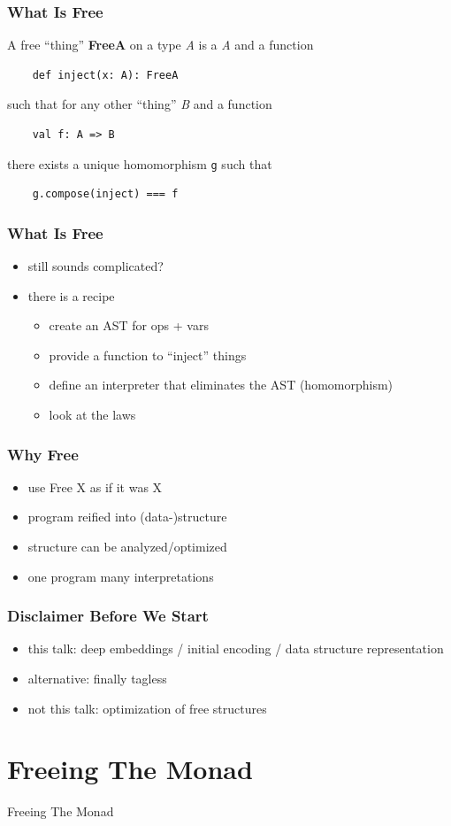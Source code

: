 \documentclass{beamer}
\newcommand{\recipe}{%
  \begin{itemize}
  \item create an AST for ops + vars
  \item provide a function to ``inject'' things
  \item define an interpreter that eliminates the AST (homomorphism)
  \item look at the laws
  \end{itemize}
}
\begin{document}
\begin{frame}[fragile]
  \frametitle{What Is Free} A free ``thing'' \textbf{FreeA} on a type
  \textit{A} is a \textit{A} and a function
  \begin{verbatim}
    def inject(x: A): FreeA
  \end{verbatim}
  such that for any other ``thing'' \textit{B} and a function
  \begin{verbatim}
    val f: A => B
  \end{verbatim}
  there exists a unique homomorphism \texttt{g} such that
  \begin{verbatim}
    g.compose(inject) === f
  \end{verbatim}
\end{frame}

\begin{frame}[fragile]
  \frametitle{What Is Free}
  \begin{itemize}
  \item still sounds complicated?
  \item there is a recipe
    \recipe{}
  \end{itemize}
\end{frame}

\begin{frame}
  \frametitle{Why Free}
  \begin{itemize}
  \item use Free X as if it was X
  \item program reified into (data-)structure
  \item structure can be analyzed/optimized
  \item one program \textemdash{} many interpretations
  \end{itemize}
\end{frame}

\begin{frame}
  \frametitle{Disclaimer Before We Start}
  \begin{itemize}
  \item this talk: deep embeddings / initial encoding / data structure representation
  \item alternative: finally tagless
  \item not this talk: optimization of free structures
  \end{itemize}
\end{frame}

\section{Freeing The Monad}\label{sec:free-monad}
\begin{frame}
  \begin{center}
    \Huge
    Freeing The Monad
  \end{center}
\end{frame}
\end{document}
